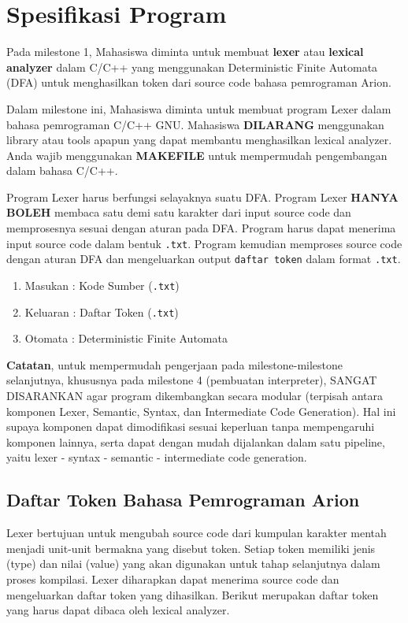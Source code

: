 \section{Spesifikasi Program}
Pada milestone 1, Mahasiswa diminta untuk membuat \textbf{lexer} atau \textbf{lexical analyzer} dalam C/C++ yang menggunakan Deterministic Finite Automata (DFA) untuk menghasilkan token dari source code bahasa pemrograman Arion.

Dalam milestone ini, Mahasiswa diminta untuk membuat program Lexer dalam bahasa pemrograman C/C++ GNU. Mahasiswa \textbf{DILARANG} menggunakan library atau tools apapun yang dapat membantu menghasilkan lexical analyzer. Anda wajib menggunakan \textbf{MAKEFILE} untuk mempermudah pengembangan dalam bahasa C/C++.

Program Lexer harus berfungsi selayaknya suatu DFA. Program Lexer \textbf{HANYA BOLEH} membaca satu demi satu karakter dari input source code dan memprosesnya sesuai dengan aturan pada DFA. Program harus dapat menerima input source code dalam bentuk \texttt{.txt}. Program kemudian memproses source code dengan aturan DFA dan mengeluarkan output \texttt{daftar token} dalam format \texttt{.txt}.

\begin{enumerate}
    \item Masukan : Kode Sumber (\texttt{.txt})
    \item Keluaran : Daftar Token (\texttt{.txt})
    \item Otomata : Deterministic Finite Automata
\end{enumerate}

\textbf{Catatan}, untuk mempermudah pengerjaan pada milestone-milestone selanjutnya, khususnya pada milestone 4 (pembuatan interpreter), SANGAT DISARANKAN agar program dikembangkan secara modular (terpisah antara komponen Lexer, Semantic, Syntax, dan Intermediate Code Generation). Hal ini supaya komponen dapat dimodifikasi sesuai keperluan tanpa mempengaruhi komponen lainnya, serta dapat dengan mudah dijalankan dalam satu pipeline, yaitu lexer - syntax - semantic - intermediate code generation.

\subsection{Daftar Token Bahasa Pemrograman Arion}
Lexer bertujuan untuk mengubah source code dari kumpulan karakter mentah menjadi unit-unit bermakna yang disebut token. Setiap token memiliki jenis (type) dan nilai (value) yang akan digunakan untuk tahap selanjutnya dalam proses kompilasi. Lexer diharapkan dapat menerima source code dan mengeluarkan daftar token yang dihasilkan. Berikut merupakan daftar token yang harus dapat dibaca oleh lexical analyzer.

